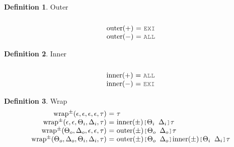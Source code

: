\documentclass[acmsmall]{acmart}
\theoremstyle{definition}
\newtheorem{definition}{Definition}[section]
\begin{document}
\begin{definition}
  Outer
  \hfill
  \\
  \[\begin{array}[t]{r@{}c@{}lcl}
    \\
    \text{outer}(+) 
    &\ =\ & 
    \J{EXI} 
    \\
    \text{outer}(-) 
    &\ =\ & 
    \J{ALL} 
  \end{array}\]
\end{definition}

\begin{definition}
  Inner
  \hfill
  \\
  \[\begin{array}[t]{r@{}c@{}lcl}
    \\
    \text{inner}(+) 
    &\ =\ & 
    \J{ALL} 
    \\
    \text{inner}(-) 
    &\ =\ & 
    \J{EXI} 
  \end{array}\]
\end{definition}

\begin{definition}
  Wrap
  \hfill
  \\
  \[
  \begin{array}[t]{r@{}c@{}lcl}
    \text{wrap}^{\pm}(\epsilon, \epsilon, \epsilon, \epsilon, \tau) 
    &\ =\ & 
    \tau
    \\
    \text{wrap}^{\pm}(\epsilon, \epsilon, \Theta_i, \Delta_i, \tau) 
    &\ =\ & 
    \text{inner}(\pm)\J{[}\Theta_i\J{ }\Delta_i\J{]}\tau
    \\
    \text{wrap}^{\pm}(\Theta_o, \Delta_o, \epsilon, \epsilon, \tau) 
    &\ =\ & 
    \text{outer}(\pm)\J{[}\Theta_o\J{ }\Delta_o\J{]}\tau
    \\
    \text{wrap}^{\pm}(\Theta_o, \Delta_o, \Theta_i, \Delta_i, \tau) 
    &\ =\ & 
    \text{outer}(\pm)\J{[}\Theta_o\J{ }\Delta_o\J{]}
    \text{inner}(\pm)\J{[}\Theta_i\J{ }\Delta_i\J{]}
    \tau
  \end{array}\]
\end{definition}
\end{document}
